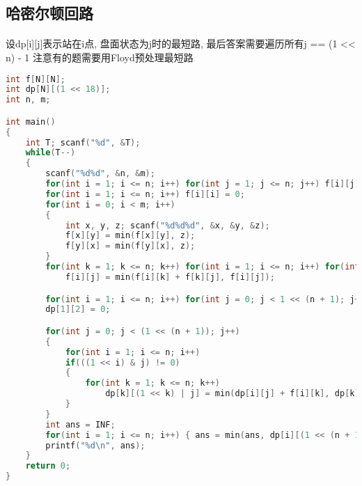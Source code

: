 ﻿\subsection{哈密尔顿回路}
	\paragraph{}
	设dp[i][j]表示站在i点, 盘面状态为j时的最短路, 最后答案需要遍历所有j == (1 << n) - 1
	注意有的题需要用Floyd预处理最短路
    \begin{lstlisting}[language=C++]
int f[N][N];
int dp[N][(1 << 18)];
int n, m;

int main()
{
    int T; scanf("%d", &T);
    while(T--)
    {
        scanf("%d%d", &n, &m);
        for(int i = 1; i <= n; i++) for(int j = 1; j <= n; j++) f[i][j] = INF;
        for(int i = 1; i <= n; i++) f[i][i] = 0;
        for(int i = 0; i < m; i++)
        {
            int x, y, z; scanf("%d%d%d", &x, &y, &z);
            f[x][y] = min(f[x][y], z);
            f[y][x] = min(f[y][x], z);
        }
        for(int k = 1; k <= n; k++) for(int i = 1; i <= n; i++) for(int j = 1; j <= n; j++)
            f[i][j] = min(f[i][k] + f[k][j], f[i][j]);

        for(int i = 1; i <= n; i++) for(int j = 0; j < 1 << (n + 1); j++) dp[i][j] = INF;
        dp[1][2] = 0;

        for(int j = 0; j < (1 << (n + 1)); j++)
        {
            for(int i = 1; i <= n; i++)
            if(((1 << i) & j) != 0)
            {
                for(int k = 1; k <= n; k++)
                    dp[k][(1 << k) | j] = min(dp[i][j] + f[i][k], dp[k][(1 << k) | j]);
            }
        }
        int ans = INF;
        for(int i = 1; i <= n; i++) { ans = min(ans, dp[i][(1 << (n + 1)) - 2] + f[i][1]); }
        printf("%d\n", ans);
    }
    return 0;
}

    \end{lstlisting}